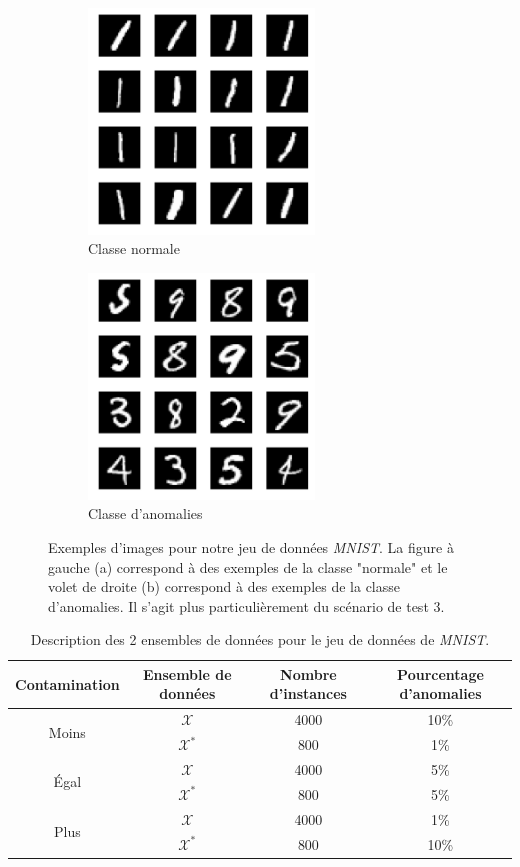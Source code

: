 \begin{figure}[htb]
	\centering
	\begin{subfigure}{6cm}
		\centering\includegraphics[width=6cm]{images/mnist-inliers}
		\caption{Classe normale}
	\end{subfigure}
	\begin{subfigure}{6cm}
		\centering\includegraphics[width=6cm]{images/mnist-outliers}
		\caption{Classe d'anomalies}
	\end{subfigure}
	\caption{Exemples d'images pour notre jeu de données \textit{MNIST}. La figure à gauche (a) correspond à des exemples de la classe "normale" et le volet de droite (b) correspond à des exemples de la classe d'anomalies. Il s'agit plus particulièrement du scénario de test 3.}
	\label{fig:mnist}
\end{figure}

\begin{table}[h]
	\centering
	\begin{tabular}{| c | c | c | c |}
		\hline
		\rowcolor{Gray}
		Contamination & Ensemble de données  & Nombre d'instances & Pourcentage d'anomalies  \\
		\hline
		\multirow{2}{*}{Moins} 
		& $\mathcal{X}$ & 4000 & 10\%  \\
		& $\mathcal{X^*}$  & 800 & 1\%  \\ 
		\midrule
		\multirow{2}{*}{Égal} 
		& $\mathcal{X}$ & 4000 & 5\%  \\
		& $\mathcal{X^*}$  & 800 & 5\%  \\ 
		\midrule
		\multirow{2}{*}{Plus} 
		& $\mathcal{X}$ & 4000 & 1\%  \\
		& $\mathcal{X^*}$  & 800 & 10\%  \\ 
		\midrule
	\end{tabular}
	\caption{Description des 2 ensembles de données pour le jeu de données de \textit{MNIST}.}
	\label{tab:dataset2}
\end{table}

